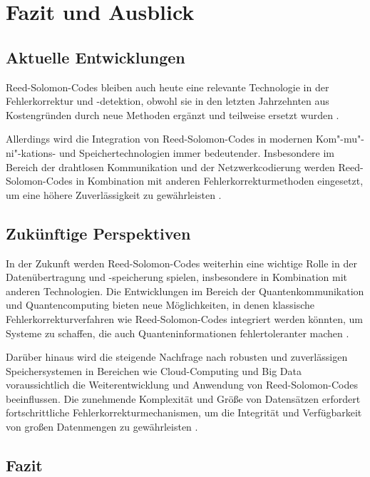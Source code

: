 \chapter{Fazit und Ausblick}\label{ch:summary}

\section{Aktuelle Entwicklungen}

Reed-Solomon-Codes bleiben auch heute eine relevante Technologie in der Fehlerkorrektur und -detektion, obwohl sie in den letzten Jahrzehnten aus Kostengründen durch neue Methoden ergänzt und teilweise ersetzt wurden \cite{ilievAnalysisEvaluationReedSolomon2008}. 

Allerdings wird die Integration von Reed-Solomon-Codes in modernen Kom"-mu"-ni"-kations- und Speichertechnologien immer bedeutender.
Insbesondere im Bereich der drahtlosen Kommunikation und der Netzwerkcodierung werden Reed-Solomon-Codes in Kombination mit anderen Fehlerkorrekturmethoden eingesetzt, um eine höhere Zuverlässigkeit zu gewährleisten \cite{conOptimalTwoDimensionalReed2024}.

\section{Zukünftige Perspektiven}

In der Zukunft werden Reed-Solomon-Codes weiterhin eine wichtige Rolle in der Datenübertragung und -speicherung spielen, insbesondere in Kombination mit anderen Technologien. 
Die Entwicklungen im Bereich der Quantenkommunikation und Quantencomputing bieten neue Möglichkeiten, in denen klassische Fehlerkorrekturverfahren wie Reed-Solomon-Codes integriert werden könnten, um Systeme zu schaffen, die auch Quanteninformationen fehlertoleranter machen \cite{grasslQuantumReedSolomonCodes1999}.

Darüber hinaus wird die steigende Nachfrage nach robusten und zuverlässigen Speichersystemen in Bereichen wie Cloud-Computing und Big Data voraussichtlich die Weiterentwicklung und Anwendung von Reed-Solomon-Codes beeinflussen. 
Die zunehmende Komplexität und Größe von Datensätzen erfordert fortschrittliche Fehlerkorrekturmechanismen, um die Integrität und Verfügbarkeit von großen Datenmengen zu gewährleisten \cite{sathiamoorthyXORingElephantsNovel2013}.

\section{Fazit}

